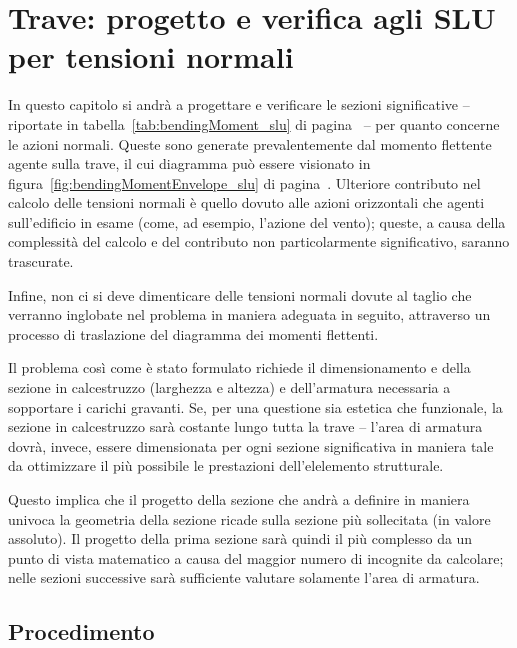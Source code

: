\chapter{Trave: progetto e verifica agli SLU per tensioni normali}\label{chap:flessioneTrave_slu}

In questo capitolo si andrà a progettare e verificare le sezioni significative -- riportate in tabella~\ref{tab:bendingMoment_slu} di pagina~\pageref{tab:bendingMoment_slu} -- per quanto concerne le azioni normali. Queste sono generate prevalentemente dal momento flettente agente sulla trave, il cui diagramma può essere visionato in figura~\ref{fig:bendingMomentEnvelope_slu} di pagina~\pageref{fig:bendingMomentEnvelope_slu}. Ulteriore contributo nel calcolo delle tensioni normali è quello dovuto alle azioni orizzontali che agenti sull'edificio in esame (come, ad esempio, l'azione del vento); queste, a causa della complessità del calcolo e del contributo non particolarmente significativo, saranno trascurate.

Infine, non ci si deve dimenticare delle tensioni normali dovute al taglio che verranno inglobate nel problema in maniera adeguata in seguito, attraverso un processo di traslazione del diagramma dei momenti flettenti.

Il problema così come è stato formulato richiede il dimensionamento e della sezione in calcestruzzo (larghezza e altezza) e dell'armatura necessaria a sopportare i carichi gravanti. Se, per una questione sia estetica che funzionale, la sezione in calcestruzzo sarà costante lungo tutta la trave --  l'area di armatura dovrà, invece, essere dimensionata per ogni sezione significativa in maniera tale da ottimizzare il più possibile le prestazioni dell'elelemento strutturale. 

Questo implica che il progetto della sezione che andrà a definire in maniera univoca la geometria della sezione ricade sulla sezione più sollecitata (in valore assoluto). Il progetto della prima sezione sarà quindi il più complesso da un punto di vista matematico a causa del maggior numero di incognite da calcolare; nelle sezioni successive sarà sufficiente valutare solamente l'area di armatura.

\section{Procedimento}\label{sec:procedimento}

